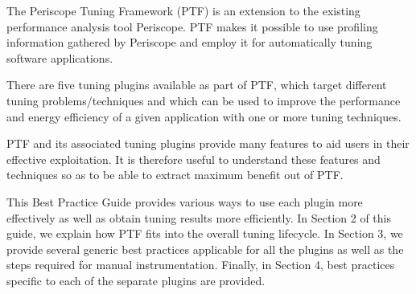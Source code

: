 The Periscope Tuning Framework (PTF) is an extension to the existing performance analysis tool Periscope. PTF makes it possible to use profiling information gathered by Periscope and employ it for automatically tuning software applications. 

There are five tuning plugins available as part of PTF, which target different tuning problems/techniques and which can be used to improve the performance and energy efficiency of a given application with one or more tuning techniques.

PTF and its associated tuning plugins provide many features to aid users in their effective exploitation. It is therefore useful to understand these features and techniques so as to be able to extract maximum benefit out of PTF. 

This Best Practice Guide provides various ways to use each plugin more effectively as well as obtain tuning results more efficiently. In Section 2 of this guide, we explain how PTF fits into the overall tuning lifecycle. In Section 3, we provide several generic best practices applicable for all the plugins as well as the steps required for manual instrumentation. Finally, in Section 4, best practices specific to each of the separate plugins are provided.
